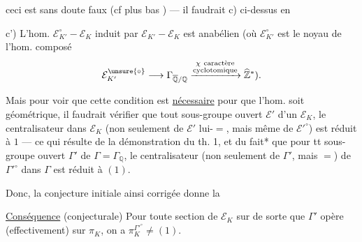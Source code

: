 ceci est sans doute faux (cf plus bas ) --- il faudrait    c) ci-dessus en

c') L'hom. $\mathcal E_{K'}^\circ-\mathcal E_K$ induit par $\mathcal E_{K'}-\mathcal E_K$ est anabélien (où $\mathcal E_{K'}^\circ$ est le noyau de l'hom. composé
\[
\mathcal E_{K'}^{\unsure{\circ}}\longrightarrow\Gamma_{\overline{\mathbb Q}/\mathbb Q}\xrightarrow{\substack{\chi\ \text{caractère}\\\text{cyclotomique}}}\widehat{\mathbb Z}^{*}).
\]

Mais pour voir que cette condition est \uline{nécessaire} pour que l'hom. soit géométrique, il faudrait  vérifier que  tout sous-groupe ouvert $\mathcal E'$ d'un $\mathcal E_K$, le centralisateur dans $\mathcal E_K$ (non seulement de $\mathcal E'$ lui-$=$, mais même de $\mathcal E'^\circ$) est réduit à $1$ --- ce qui résulte de la démonstration du th. 1, et du fait* que pour tt sous-groupe ouvert $\Gamma'$ de $\Gamma=\Gamma_{\mathbb Q}$, le centralisateur (non seulement de $\Gamma'$, mais $=$) de $\Gamma'^\circ$ dans $\Gamma$ est réduit à $(1)$.

Donc, la conjecture initiale ainsi  corrigée donne la

\uline{Conséquence} (conjecturale) Pour toute  section de $\mathcal E_K$ sur   de sorte que $\Gamma'$ opère (effectivement) sur $\pi_K$, on a  $\pi_K^{\Gamma'^\circ}\ne(1)$.
